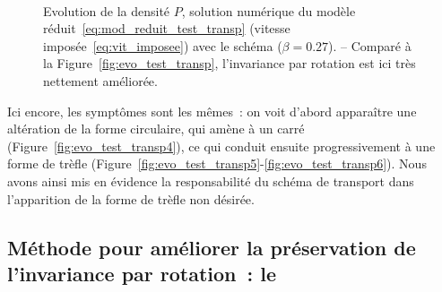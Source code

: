 \documentclass[main.tex]{subfiles}
\begin{document}
\begin{figure}
\centering
\\
\caption{Evolution de la densité $P$, solution numérique du modèle réduit~\eqref{eq:mod_reduit_test_transp} (vitesse imposée~\eqref{eq:vit_imposee}) avec le schéma \twinweno ($\beta=0.27$). -- Comparé à la Figure~\ref{fig:evo_test_transp}, l'invariance par rotation est ici très nettement améliorée. \label{fig:evo_test_transp_twinweno}}
\end{figure}
Ici encore, les symptômes sont les mêmes~: on voit d'abord apparaître une altération de la forme circulaire, qui amène à un carré (\cf Figure~\ref{fig:evo_test_transp4}), ce qui conduit ensuite  progressivement à une forme de trèfle (\cf Figure~\ref{fig:evo_test_transp5}-\ref{fig:evo_test_transp6}).
Nous avons ainsi mis en évidence la responsabilité du schéma de transport dans l'apparition de la forme de trèfle non désirée.


\subsection{Méthode pour améliorer la préservation de l'invariance par rotation~: le \twinweno  \label{sec:twinweno}}
%
\end{document}
